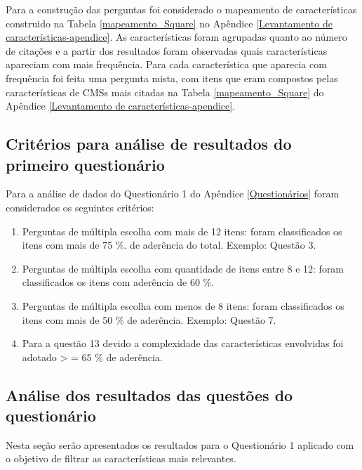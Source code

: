 Para a construção das perguntas foi considerado o mapeamento de características construido na Tabela \ref{mapeamento_Square} no Apêndice \ref{Levantamento de características-apendice}. As características foram agrupadas quanto ao número de citações e a partir dos resultados foram observadas quais características apareciam com mais frequência. Para cada característica que aparecia com frequência foi feita uma pergunta mista, com itens que eram compostos pelas características de CMSs mais citadas na Tabela \ref{mapeamento_Square} do Apêndice \ref{Levantamento de características-apendice}.

\subsection{Critérios para análise de resultados do primeiro questionário}

Para a análise de dados do Questionário 1 do Apêndice \ref{Questionários} foram considerados os seguintes critérios:

\begin{enumerate}
\item Perguntas de múltipla escolha com mais de 12 itens: foram classificados os itens com mais de 75 \%. de aderência do total. Exemplo: Questão 3.

\item Perguntas de múltipla escolha com quantidade de itens entre 8 e 12: foram classificados os itens com aderência de 60 \%.
 
\item Perguntas de múltipla escolha com menos de 8 itens: foram classificados os itens com mais de 50 \% de aderência. Exemplo: Questão 7.

\item Para a questão 13 devido a complexidade das características envolvidas foi adotado > = 65 \% de aderência. 


\end{enumerate}

\subsection{Análise dos resultados das questões do questionário}
\label{resultados_questionário_1}

Nesta seção serão apresentados os resultados para o Questionário 1 aplicado com o objetivo de filtrar as características mais relevantes.



